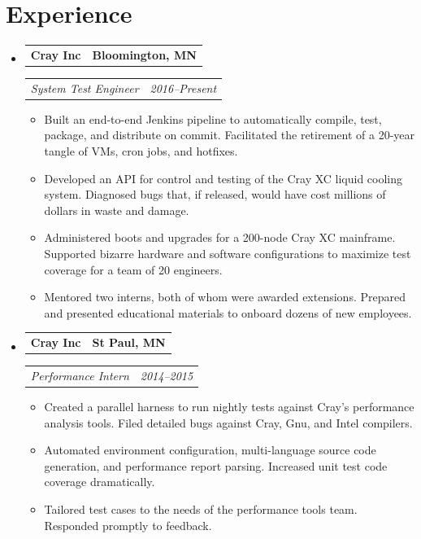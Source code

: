 \documentclass[11pt,letterpaper]{article}
\makeatletter
\newcommand{\headerrow}[2]{
    \begin{tabular*}{\linewidth}{l@{ \extracolsep{\fill} }r} #1 & #2
    \end{tabular*}
}
\newcommand{\YearRange}[2]{#1--#2}
\newcommand{\ResumeSection}[1]{
    \section*{ {\color{MidnightBlue}#1 \sout{\hfill} } }
}
\makeatother
\begin{document}
\ResumeSection{Experience}

\begin{itemize}[leftmargin=\parindent]
    \parskip=0.1em
    \itemsep=1.5em

    \item[]
        \headerrow{ \textbf{Cray Inc} }{ \textbf{Bloomington, MN} }
        \headerrow
            { \emph{System Test Engineer} }
            { \emph{ \YearRange{2016}{Present} } }
        \begin{itemize}
            \item Built an end-to-end Jenkins pipeline to automatically compile, test, package, and distribute on commit. Facilitated the retirement of a 20-year tangle of VMs, cron jobs, and hotfixes.
            \item Developed an API for control and testing of the Cray XC liquid cooling system. Diagnosed bugs that, if released, would have cost millions of dollars in waste and damage.
            \item Administered boots and upgrades for a 200-node Cray XC mainframe. Supported bizarre hardware and software configurations to maximize test coverage for a team of 20 engineers.
            \item Mentored two interns, both of whom were awarded extensions. Prepared and presented educational materials to onboard dozens of new employees.
        \end{itemize}

    \item[]
        \headerrow{ \textbf{Cray Inc} }{ \textbf{St Paul, MN} }
        \headerrow
            { \emph{Performance Intern} }
            { \emph{ \YearRange{2014}{2015} } }
        \begin{itemize}
            \item Created a parallel harness to run nightly tests against Cray's performance analysis tools. Filed detailed bugs against Cray, Gnu, and Intel compilers.
            \item Automated environment configuration, multi-language source code generation, and performance report parsing. Increased unit test code coverage dramatically.
            \item Tailored test cases to the needs of the performance tools team. Responded promptly to feedback.
        \end{itemize}


\end{itemize}
\end{document}
